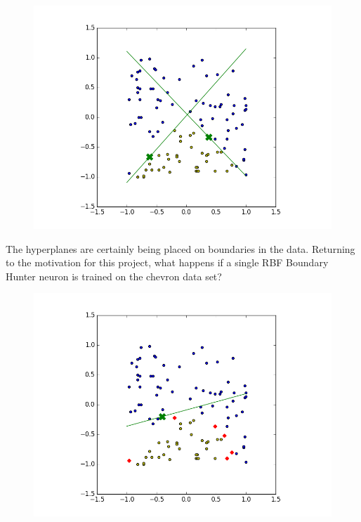 \documentclass[notitlepage]{report}
\theoremstyle{definition}
\begin{document}
\begin{figure}[H]
  \centering
  \begin{minipage}[b]{0.7\textwidth}
    \includegraphics[width=\textwidth]{RBFN-BH-03.png}
    \caption{}
    \label{fig:RBFN-BH-03}
  \end{minipage}
  \hfill
\end{figure}

The hyperplanes are certainly being placed on boundaries in the data. Returning to the motivation for this project, what happens if a single RBF Boundary Hunter neuron is trained on the chevron data set?

\begin{figure}[H]
  \centering
  \begin{minipage}[b]{0.7\textwidth}
    \includegraphics[width=\textwidth]{RBFN-BH-04.png}
    \caption{}
    \label{fig:RBFN-BH-04}
  \end{minipage}
  \hfill
\end{figure}
\end{document}
